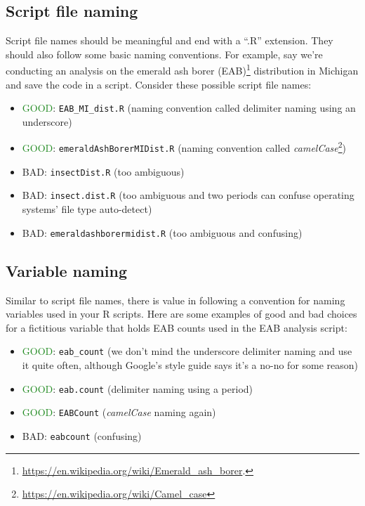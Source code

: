 \documentclass[
]{krantz}
\providecommand{\tightlist}{%
  \setlength{\itemsep}{0pt}\setlength{\parskip}{0pt}}
\begin{document}
\hypertarget{script-file-naming}{%
\subsection{Script file naming}\label{script-file-naming}}

Script file names should be meaningful and end with a ``.R'' extension. They should also follow some basic naming conventions. For example, say we're conducting an analysis on the emerald ash borer (EAB)\footnote{\url{https://en.wikipedia.org/wiki/Emerald_ash_borer}.} distribution in Michigan and save the code in a script. Consider these possible script file names:

\begin{itemize}
\tightlist
\item
  \textcolor{ForestGreen}{GOOD}: \texttt{EAB\_MI\_dist.R} (naming convention called delimiter naming using an underscore)
\item
  \textcolor{ForestGreen}{GOOD}: \texttt{emeraldAshBorerMIDist.R} (naming convention called \emph{camelCase}\footnote{\url{https://en.wikipedia.org/wiki/Camel_case}})
\item
  \textcolor{RedOrange}{BAD}: \texttt{insectDist.R} (too ambiguous)
\item
  \textcolor{RedOrange}{BAD}: \texttt{insect.dist.R} (too ambiguous and two periods can confuse operating systems' file type auto-detect)
\item
  \textcolor{RedOrange}{BAD}: \texttt{emeraldashborermidist.R} (too ambiguous and confusing)
\end{itemize}

\hypertarget{variable-naming}{%
\subsection{Variable naming}\label{variable-naming}}

Similar to script file names, there is value in following a convention for naming variables used in your R scripts. Here are some examples of good and bad choices for a fictitious variable that holds EAB counts used in the EAB analysis script:

\begin{itemize}
\tightlist
\item
  \textcolor{ForestGreen}{GOOD}: \texttt{eab\_count} (we don't mind the underscore delimiter naming and use it quite often, although Google's style guide says it's a no-no for some reason)
\item
  \textcolor{ForestGreen}{GOOD}: \texttt{eab.count} (delimiter naming using a period)
\item
  \textcolor{ForestGreen}{GOOD}: \texttt{EABCount} (\emph{camelCase} naming again)
\item
  \textcolor{RedOrange}{BAD}: \texttt{eabcount} (confusing)
\end{itemize}
\end{document}
